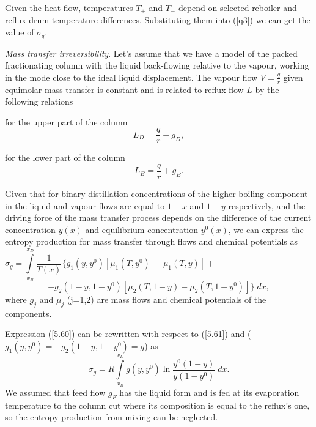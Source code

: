 \documentclass[12pt]{article}
\begin{document}
Given the heat flow, temperatures $T_+$ and $T_-$ depend on selected reboiler and reflux drum temperature differences. Substituting them into (\ref{q3}) we can get the value of $\sigma_q$.

\textit{Mass transfer irreversibility}. Let's assume that we have a model of the packed fractionating column with the liquid back-flowing relative to the vapour, working in the mode close to the ideal liquid displacement.
 The vapour flow $V=\frac{q}{r}$ given equimolar mass transfer is constant and is related to reflux flow $L$ by the following relations

for the upper part of the column
\begin{equation}
L_{D} = \frac{q}{r}-  g_D,
\label{q1}
\end{equation}

for the lower part of the column
\begin{equation}
L_{B}= \frac{q}{r}+ g_{B}.
\label{q2}
\end{equation}

Given that for binary distillation concentrations of the higher boiling component in the liquid and vapour flows are equal to $1-x$ and $1-y$ respectively, and the driving force of the mass transfer process depends on the difference of the current concentration $y(x)$ and equilibrium concentration $y^0(x)$, we can express the entropy production for mass transfer through flows and chemical potentials as
$$
\sigma_g= \int\limits^{x_D}_{x_B}\frac{1}{T(x)} \{ g_1(y, y^0) [ \mu_1(T, y^0) \;
-\mu_1(T, y)]+\phantom{wwwwwwwwwwwwwwwwwwwwwwww}
$$
\begin{equation}\label{5.60}
+ g_2(1-y, 1-y^0)[ \mu_2(T, 1-y)- \mu_2(T, 1-y^0)] \} \; dx,
\end{equation}
where $g_j$ and $\mu_j$ (j=1,2) are mass flows and chemical potentials of the components.

Expression (\ref{5.60}) can be rewritten with respect to (\ref{5.61}) and ($g_1(y, y^0)=- g_2(1-y, 1-y^0)=g$) as
\begin{equation}\label{5.62}
\sigma_g=R \int\limits^{x_D}_{x_B} g(y, y^0)\ln \frac{y^0(1-y)}{y(1-y^0)} \; dx.
\end{equation}
We assumed that feed flow $g_{F}$ has the liquid form and is fed at its evaporation temperature to the column cut where its composition is equal to the reflux's one, so the entropy production from mixing can be neglected.
\end{document}
